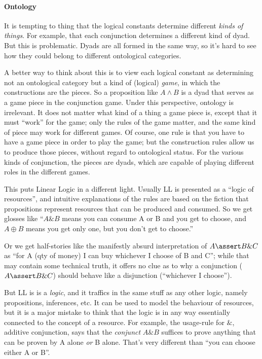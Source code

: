 \documentclass{article}
\begin{document}
\paragraph{Ontology}

It is tempting to thing that the logical constants determine different
\textit{kinds of things}. For example, that each conjunction
determines a different kind of dyad. But this is problematic. Dyads
are all formed in the same way, so it's hard to see how they could
belong to different ontological categories.

A better way to think about this is to view each logical constant as
determining not an ontological category but a kind of (logical)
\textit{game}, in which the constructions are the pieces. So a
proposition like \(A\land B\) is a dyad that serves as a game piece in
the conjunction game. Under this perspective, ontology is irrelevant.
It does not matter what kind of a thing a game piece is, except that
it must ``work'' for the game; only the rules of the game matter, and
the same kind of piece may work for different games. Of course, one
rule is that you have to have a game piece in order to play the game;
but the construction rules allow us to produce those pieces, without
regard to ontological status. For the various kinds of conjunction,
the pieces are dyads, which are capable of playing different roles in
the different games.

This puts Linear Logic in a different light. Usually LL is presented
as a ``logic of resources'', and intuitive explanations of the rules
are based on the fiction that propositions represent resources that
can be produced and consumed. So we get glosses like ``\(A\&B\) means
you can consume A or B and you get to choose, and \(A\oplus B\) means
you get only one, but you don't get to choose.''

Or we get half-stories like the manifestly absurd interpretation of
\(A\linfer B\&C\) as ``for A (qty of money) I can buy whichever I
choose of B and C''; while that may contain some technical truth, it
offers no clue as to why a conjunction (\(A\linfer B\&C\)) should
behave like a disjunction (``whichever I choose'').

But LL is is a \textit{logic}, and it traffics in the same stuff as
any other logic, namely propositions, inferences, etc. It can be used
to model the behaviour of resources, but it is a major mistake to
think that the logic is in any way essentially connected to the
concept of a resource. For example, the usage-rule for \(\&\),
additive conjunction, says that the \textit{conjunct} \(A\&B\)
suffices to prove anything that can be proven by A alone \textit{or} B
alone.  That's very different than ``you can choose either A or B''.
\end{document}
